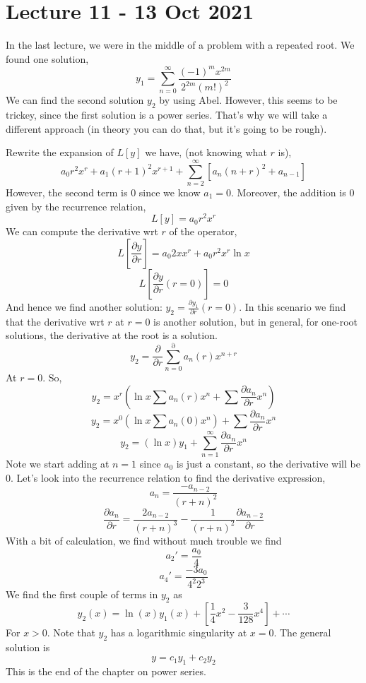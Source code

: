 \section{Lecture 11 - 13 Oct 2021}
In the last lecture, we were in the middle of a problem with a repeated root. We found one
solution,
\[y_1 = \sum_{n=0}^{\infty} \frac{(-1)^m x^{2m}}{2^{2m}(m!)^2}\]
We can find the second solution $y_{2}$ by using Abel. However, this seems to be trickey,
since the first solution is a power series. That's why we will take a different approach
(in theory you can do that, but it's going to be rough).

Rewrite the expansion of $L[y]$ we have, (not knowing what $r$ is),
\[a_0 r^2 x^r + a_1 (r+1)^2x^{r+1} + \sum_{n=2}^{\infty} [a_n (n+r)^2 + a_{n-1}]\]
However, the second term is $0$ since we know $a_1=0$. Moreover, the addition is
$0$ given by the recurrence relation,
\[L[y] = a_0r^2x^r\]
We can compute the derivative wrt $r$ of the operator,
\[L[\frac{\partial y}{\partial r}] = a_0 2x x^r + a_0r^2 x^{r}\ln x\]
\[L[\frac{\partial y}{\partial r} (r=0)] = 0\]
And hence we find another solution: $y_2 = \frac{\partial y_1}{\partial r} (r=0)$. In this
scenario we find that the derivative wrt $r$ at $r=0$ is another solution, but in general,
for one-root solutions, the derivative at the root is a solution.
\[y_2 = \frac{\partial}{\partial r} \sum_{n=0}^{\partial} a_n(r) x^{n+r}\]
At $r=0$. So,
\[y_2 = x^r (\ln x \sum a_n(r) x^n + \sum \frac{\partial a_n}{\partial r} x^n)\]
\[y_2 = x^0 (\ln x \sum a_n(0) x^n) + \sum \frac{\partial a_n}{\partial r} x^n\]
\[y_2 = (\ln x)y_1 + \sum_{n=1}^{\infty} \frac{\partial a_n}{\partial r} x^n\]
Note we start adding at $n=1$ since $a_0$ is just a constant, so the derivative will be 0.
Let's look into the recurrence relation to find the derivative expression,
\[a_n = \frac{-a_{n-2}}{(r+n)^2}\]
\[\frac{\partial a_n}{\partial r} = \frac{2a_{n-2}}{(r+n)^3} - \frac{1}{(r+n)^2}
\frac{\partial a_{n-2}}{\partial r}\]
With a bit of calculation, we find without much trouble we find
\[a_{2}' = \frac{a_0}{4}\]
\[a_4' =\frac{-3a_0}{4^2 2^3}\]
We find the first couple of terms in $y_2$ as 
\[y_2(x) = \ln(x) y_1 (x) + [\frac{1}{4}x^2 - \frac{3}{128}x^4] + \cdots\]
For $x>0$. Note that $y_2$ has a logarithmic singularity at $x=0$. The general solution is
\[y = c_1 y_1 + c_2 y_2\]
This is the end of the chapter on power series.


